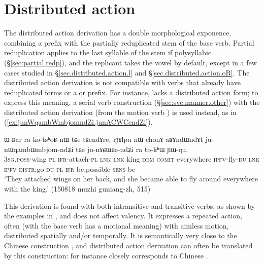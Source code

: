 \section{Distributed action} \label{sec:distributed.action} 
The distributed action derivation has a double morphological exponence, combining a prefix  with the partially reduplicated stem of the base verb. Partial reduplication applies to the last syllable of the stem if polysyllabic (§\ref{sec:partial.redp}), and the replicant takes the vowel  by default, except in a few cases studied in §\ref{sec.distributed.action.l} and §\ref{sec.distributed.action.oR}. The distributed action derivation is not compatible with verbs that already have reduplicated forms or a  or  prefix. For instance,  lacks a distributed action form; to express this meaning, a serial verb construction (§\ref{sec:svc.manner.other}) with the distributed action derivation   (from the motion verb ) is used instead, as in (\ref{ex:junWqambWmbjomndZi.junACWCendZi}).

\begin{exe}
\ex \label{ex:junWqambWmbjomndZi.junACWCendZi}
\gll  ɯ-ʁar ra ko-tsʰoʁ-nɯ tɕe tɕendɤre, rɟɤlpu nɯ chonɤ aʁɤndɯndɤt ju-nɯqambɯmbjom-ndʑi tɕe ju-nɤɕɯɕe-ndʑi ra to-kʰɯ ɲɯ-ŋu. \\
\textsc{3sg}.\textsc{poss}-wing \textsc{pl} \textsc{ifr}-attach-\textsc{pl} \textsc{lnk} \textsc{lnk} king \textsc{dem} \textsc{comit} everywhere \textsc{ipfv}-fly-\textsc{du} \textsc{lnk} \textsc{ipfv}-\textsc{distr}:go-\textsc{du} \textsc{pl} \textsc{ifr}-be.possible \textsc{sens}-be \\
\glt `They attached wings on her back, and she became able to fly around everywhere with the king.' (150818 muzhi guniang-zh, 515)
\end{exe}

 
This derivation is found with both intransitive and transitive verbs, as shown by the examples in , and does not affect valency. It expresses a repeated action, often (with the base verb has a motional meaning) with aimless motion, distributed spatially and/or temporally. It is semantically very close to the Chinese construction   , and distributed action derivation can often be translated by this construction: for instance  closely corresponds to Chinese   .


